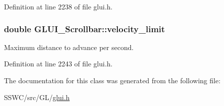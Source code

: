 Definition at line 2238 of file glui.\+h.

\hypertarget{class_g_l_u_i___scrollbar_a3d738432dded440f6733bdd95116622e}{
\subsubsection[{velocity\+\_\+limit}]{\setlength{\rightskip}{0pt plus 5cm}double G\+L\+U\+I\+\_\+\+Scrollbar\+::velocity\+\_\+limit}}\label{class_g_l_u_i___scrollbar_a3d738432dded440f6733bdd95116622e}


Maximum distance to advance per second. 



Definition at line 2243 of file glui.\+h.



The documentation for this class was generated from the following file\+:\begin{DoxyCompactItemize}
\item 
S\+S\+W\+C/src/\+G\+L/\hyperlink{glui_8h}{glui.\+h}\end{DoxyCompactItemize}
